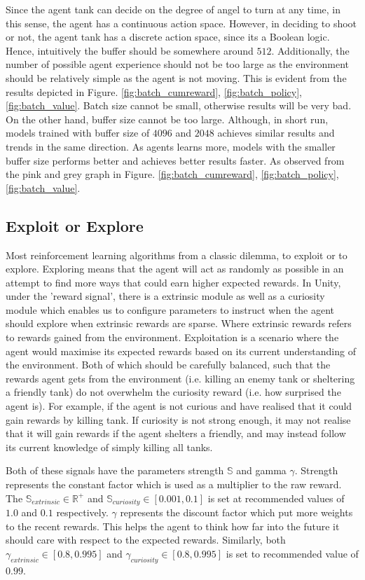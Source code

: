 Since the agent tank can decide on the degree of angel to turn at any time, in this sense, the agent has a continuous action space. However, in deciding to shoot or not, the agent tank has a discrete action space, since its a Boolean logic. Hence, intuitively the buffer should be somewhere around $512$. Additionally, the number of possible agent experience should not be too large as the environment should be relatively simple as the agent is not moving. This is evident from the results depicted in Figure. \ref{fig:batch_cumreward}, \ref{fig:batch_policy}, \ref{fig:batch_value}. Batch size cannot be small, otherwise results will be very bad. On the other hand, buffer size cannot be too large. Although, in short run, models trained with buffer size of $4096$ and $2048$ achieves similar results and trends in the same direction. As agents learns more, models with the smaller buffer size performs better and achieves better results faster. As observed from the pink and grey graph in Figure. \ref{fig:batch_cumreward}, \ref{fig:batch_policy}, \ref{fig:batch_value}.


\subsection{Exploit or Explore}
Most reinforcement learning algorithms from a classic dilemma, to exploit or to explore. Exploring means that the agent will act as randomly as possible in an attempt to find more ways that could earn higher expected rewards. In Unity, under the 'reward signal', there is a extrinsic module as well as a curiosity module which enables us to configure parameters to instruct when the agent should explore when extrinsic rewards are sparse. Where extrinsic rewards refers to rewards gained from the environment. Exploitation is a scenario where the agent would maximise its expected rewards based on its current understanding of the environment. Both of which should be carefully balanced, such that the rewards agent gets from the environment (i.e. killing an enemy tank or sheltering a friendly tank) do not overwhelm the curiosity reward (i.e. how surprised the agent is). For example, if the agent is not curious and have realised that it could gain rewards by killing tank. If curiosity is not strong enough, it may not realise that it will gain rewards if the agent shelters a friendly, and may instead follow its current knowledge of simply killing all tanks.

Both of these signals have the parameters strength $\mathbb{S}$ and gamma $\gamma$. Strength represents the constant factor which is used as a multiplier to the raw reward. The $\mathbb{S}_{extrinsic} \in \mathbb{R}^+$ and $\mathbb{S}_{curiosity} \in [0.001, 0.1]$ is set at recommended values of $1.0$ and $0.1$ respectively. $\gamma$ represents the discount factor which put more weights to the recent rewards. This helps the agent to think how far into the future it should care with respect to the expected rewards. Similarly, both $\gamma_{extrinsic} \in [0.8 , 0.995]$ and $\gamma_{curiosity} \in [0.8, 0.995]$ is set to recommended value of $0.99$. 


